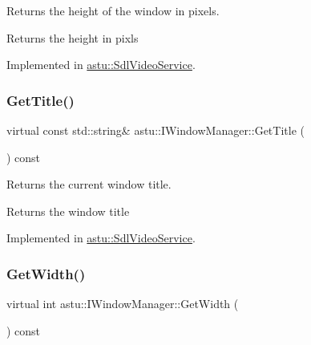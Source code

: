 Returns the height of the window in pixels.

\begin{DoxyReturn}{Returns}
the height in pixls 
\end{DoxyReturn}


Implemented in \hyperlink{classastu_1_1SdlVideoService_a76d0f56254c9545d4d9762349133d4af}{astu\+::\+Sdl\+Video\+Service}.

\mbox{\label{classastu_1_1IWindowManager_aa5733f1ceda60796f6e35f5f7b79ffa9}} 
\subsubsection{\texorpdfstring{Get\+Title()}{GetTitle()}}
{\footnotesize\ttfamily virtual const std\+::string\& astu\+::\+I\+Window\+Manager\+::\+Get\+Title (\begin{DoxyParamCaption}{ }\end{DoxyParamCaption}) const\hspace{0.3cm}{\ttfamily [pure virtual]}}

Returns the current window title.

\begin{DoxyReturn}{Returns}
the window title 
\end{DoxyReturn}


Implemented in \hyperlink{classastu_1_1SdlVideoService_ad6ee7f7a409960e91ddd77bbcea6432f}{astu\+::\+Sdl\+Video\+Service}.

\mbox{\label{classastu_1_1IWindowManager_a6f818a88754bde33c3121e7413d3a554}} 
\subsubsection{\texorpdfstring{Get\+Width()}{GetWidth()}}
{\footnotesize\ttfamily virtual int astu\+::\+I\+Window\+Manager\+::\+Get\+Width (\begin{DoxyParamCaption}{ }\end{DoxyParamCaption}) const\hspace{0.3cm}{\ttfamily [pure virtual]}}

